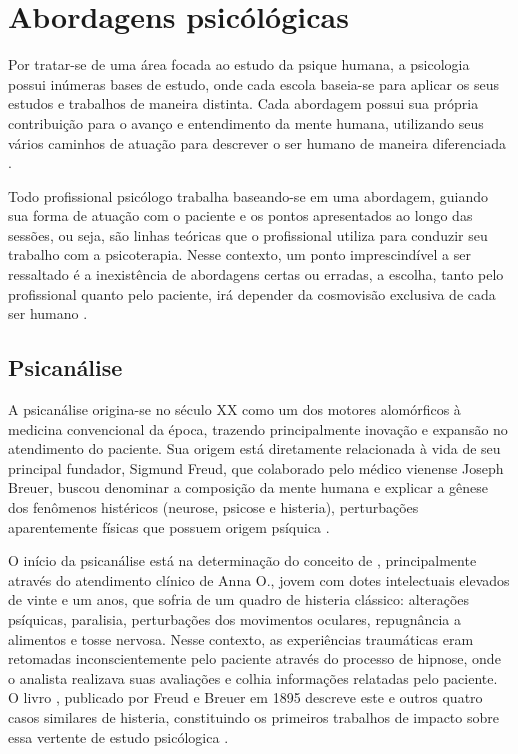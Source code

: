 \section{Abordagens psicólógicas}
\label{sec:abordagensPsicologicas}

Por tratar-se de uma área focada ao estudo da psique humana, a psicologia possui inúmeras bases de estudo, onde cada escola baseia-se para aplicar os seus estudos e trabalhos de maneira distinta. Cada abordagem possui sua própria contribuição para o avanço e entendimento da mente humana, utilizando seus vários caminhos de atuação para descrever o ser humano de maneira diferenciada \cite{Anhanguera2022}.

Todo profissional psicólogo trabalha baseando-se em uma abordagem, guiando sua forma de atuação com o paciente e os pontos apresentados ao longo das sessões, ou seja, são linhas teóricas que o profissional utiliza para conduzir seu trabalho com a psicoterapia. Nesse contexto, um ponto imprescindível a ser ressaltado é a inexistência de abordagens certas ou erradas, a escolha, tanto pelo profissional quanto pelo paciente, irá depender da cosmovisão exclusiva de cada ser humano \cite{Barros2022}.

\subsection{Psicanálise}
\label{sec:psicanalise}
A psicanálise origina-se no século XX como um dos motores alomórficos à medicina convencional da época, trazendo principalmente inovação e expansão no atendimento do paciente. Sua origem está diretamente relacionada à vida de seu principal fundador, Sigmund Freud, que colaborado pelo médico vienense Joseph Breuer, buscou denominar a composição da mente humana e explicar a gênese dos fenômenos histéricos (neurose, psicose e histeria), perturbações aparentemente físicas que possuem origem psíquica \cite{Clinica2017}.

O início da psicanálise está na determinação do conceito de , principalmente através do atendimento clínico de Anna O., jovem com dotes intelectuais elevados de vinte e um anos, que sofria de um quadro de histeria clássico: alterações psíquicas, paralisia, perturbações dos movimentos oculares, repugnância a alimentos e tosse nervosa. Nesse contexto, as experiências traumáticas eram retomadas inconscientemente pelo paciente através do processo de hipnose, onde o analista realizava suas avaliações e colhia informações relatadas pelo paciente. O livro , publicado por Freud e Breuer em 1895 descreve este e outros quatro casos similares de histeria, constituindo os primeiros trabalhos de impacto sobre essa vertente de estudo psicólogica \cite{Clinica2017}.

